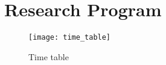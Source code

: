 \section{Research Program}

\begin{figure}[h]
	\centering
	\texttt{[image: time\_table]}
	\caption{Time table}
\end{figure}